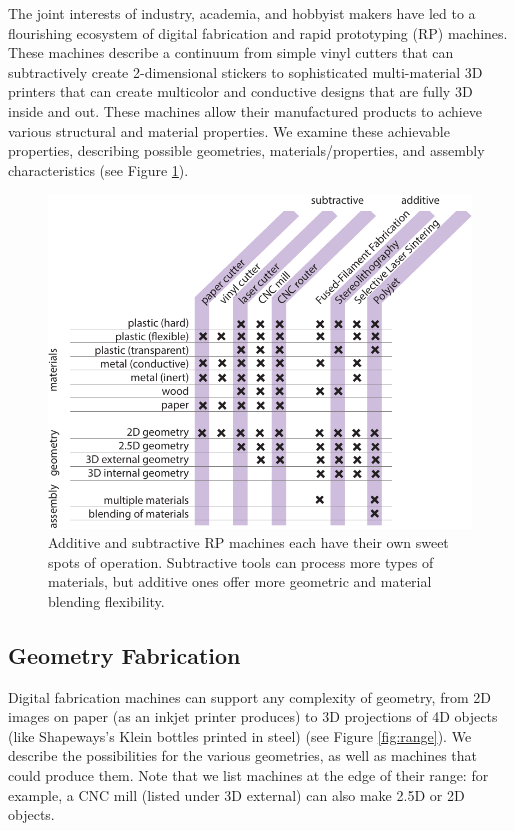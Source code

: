 The joint interests of industry, academia, and hobbyist makers have led to a flourishing ecosystem of digital fabrication and rapid prototyping (RP) machines. These machines describe a continuum from simple vinyl cutters that can subtractively create 2-dimensional stickers to sophisticated multi-material 3D printers that can create multicolor and conductive designs that are fully 3D inside and out. These machines allow their manufactured products to achieve various structural and material properties. We examine these achievable properties, describing possible geometries, materials/properties, and assembly characteristics (see Figure \ref{table:properties}).


\begin{figure}
\centering
\includegraphics[width=5in]{figures/fab-properties.pdf}
\caption{Additive and subtractive RP machines each have their own sweet spots of operation. Subtractive tools can process more types of materials, but additive ones offer more geometric and material blending flexibility.}
\label{table:properties}
\end{figure}

\subsection{Geometry Fabrication}

Digital fabrication machines can support any complexity of geometry, from 2D images on paper (as an inkjet printer produces) to 3D projections of 4D objects (like Shapeways's Klein bottles printed in steel) (see Figure \ref{fig:range}). We describe the possibilities for the various geometries, as well as machines that could produce them. Note that we list machines at the edge of their range: for example, a CNC mill (listed under 3D external) can also make 2.5D or 2D objects.

